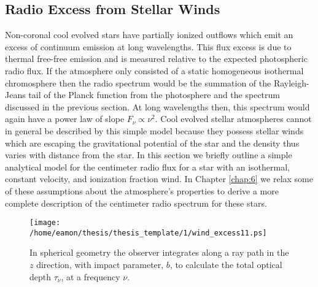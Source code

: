 \subsection{Radio Excess from Stellar Winds}\label{sec:1.8.4}
Non-coronal cool evolved stars have partially ionized outflows which emit an excess of continuum emission at long wavelengths. This flux excess is due to thermal free-free emission and is measured relative to the expected photospheric radio flux. If the atmosphere only consisted of a static homogeneous isothermal chromosphere then the radio spectrum would be the summation of the Rayleigh-Jeans tail of the Planck function from the photosphere and the  spectrum discussed in the previous section. At long wavelengths then, this spectrum would again have a power law of slope $F_{\nu} \propto \nu ^{2}$. Cool evolved stellar atmospheres cannot in general be described by this simple model because they possess stellar winds which are escaping the gravitational potential of the star and the density thus varies with distance from the star. In this section we briefly outline a simple analytical model for the centimeter radio flux for a star with an isothermal, constant velocity, and ionization fraction wind. In Chapter \ref{chap:6} we relax some of these assumptions about the atmosphere's properties to derive a more complete description of the centimeter radio spectrum for these stars.

\begin{figure}[hbt!]\label{fig:1.5.4}
\centering 
          \texttt{[image: /home/eamon/thesis/thesis\_template/1/wind\_excess11.ps]}
\caption[Schematic for stellar wind radio emission excess]{In spherical geometry the observer integrates along a ray path in the $z$ direction, with impact parameter, $b$, to calculate the total optical depth $\tau _{\nu}$, at a frequency $\nu$.}
\label{fig:1.5.4}
\end{figure}

